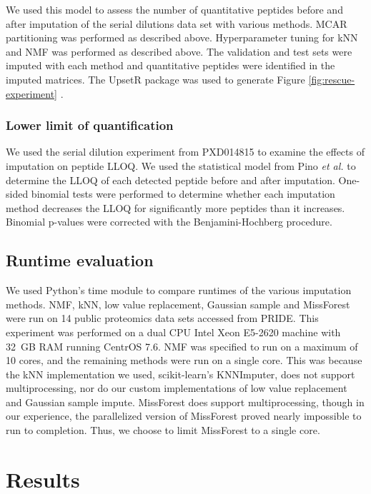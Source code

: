 \documentclass{article}
\newcommand{\fixme}[1]{{\color{red}{#1}}}
\begin{document}
We used this model to assess the number of quantitative peptides before and after imputation of the serial dilutions data set with various methods. MCAR partitioning was performed as described above. Hyperparameter tuning for kNN and NMF was performed as described above. The validation and test sets were imputed with each method and quantitative peptides were identified in the imputed matrices. The UpsetR package was used to generate Figure \ref{fig:rescue-experiment} \cite{UpsetR}.

\subsubsection{Lower limit of quantification}

We used the serial dilution experiment from PXD014815 to examine the effects of imputation on peptide LLOQ. We used the statistical model from Pino \textit{et al.} \cite{matrix-matched-calib} to determine the LLOQ of each detected peptide before and after imputation. One-sided binomial tests were performed to determine whether each imputation method decreases the LLOQ for significantly more peptides than it increases. Binomial p-values were corrected with the Benjamini-Hochberg procedure.

\subsection{Runtime evaluation}

We used Python's time module to compare runtimes of the various imputation methods. NMF, kNN, low value replacement, Gaussian sample and MissForest were run on 14 public proteomics data sets accessed from PRIDE. This experiment was performed on a dual CPU Intel Xeon E5-2620 machine with 32~GB RAM running CentrOS 7.6. NMF was specified to run on a maximum of 10 cores, and the remaining methods were run on a single core. This was because the kNN implementation we used, scikit-learn's KNNImputer, does not support multiprocessing, nor do our custom implementations of low value replacement and Gaussian sample impute. MissForest does support multiprocessing, though in our experience, the parallelized version of MissForest proved nearly impossible to run to completion. Thus, we choose to limit MissForest to a single core. 


\section{Results}
\end{document}
